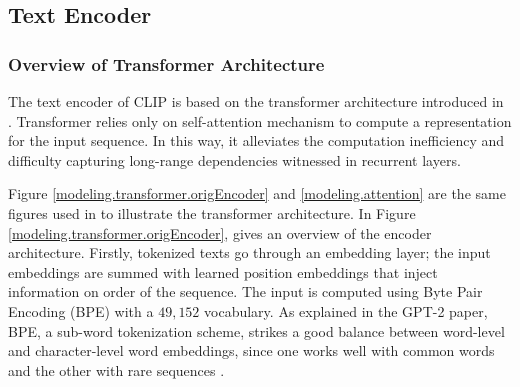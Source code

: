 \subsection{Text Encoder} \label{clip.text.encoder}

\subsubsection*{Overview of Transformer Architecture}
The text encoder of CLIP is based on the transformer architecture introduced in \citet{attentionAllYouNeed}. Transformer relies only on self-attention mechanism to compute a representation for the input sequence. In this way, it alleviates the computation inefficiency and difficulty capturing long-range dependencies witnessed in recurrent layers.  

Figure \ref{modeling.transformer.origEncoder} and \ref{modeling.attention} are the same figures used in \cite{attentionAllYouNeed} to illustrate the transformer architecture. In Figure \ref{modeling.transformer.origEncoder}, \cite{attentionAllYouNeed} gives an overview of the encoder architecture. Firstly, tokenized texts go through an embedding layer; the input embeddings are summed with learned position embeddings that inject information on order of the sequence. 
The input is computed using Byte Pair Encoding (BPE) with a $49,152$ vocabulary. As explained in the GPT-2 paper, BPE, a sub-word tokenization scheme, strikes a good balance between word-level and character-level word embeddings, since one works well with common words and the other with rare sequences \citep{Radford2019LanguageMA}.

